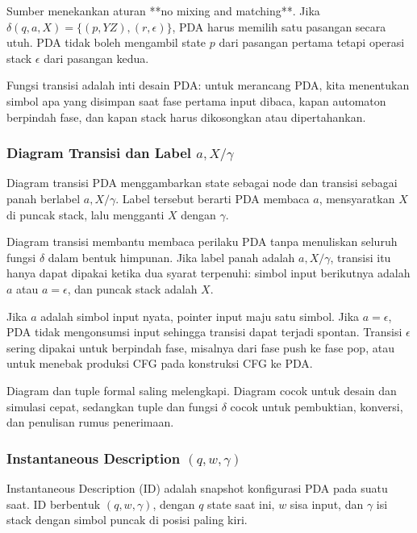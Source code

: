 Sumber menekankan aturan **no mixing and matching**. Jika $\delta(q,a,X)=\{(p,YZ),(r,\epsilon)\}$, PDA harus memilih satu pasangan secara utuh. PDA tidak boleh mengambil state $p$ dari pasangan pertama tetapi operasi stack $\epsilon$ dari pasangan kedua.

Fungsi transisi adalah inti desain PDA: untuk merancang PDA, kita menentukan simbol apa yang disimpan saat fase pertama input dibaca, kapan automaton berpindah fase, dan kapan stack harus dikosongkan atau dipertahankan.

\subsubsection{\texorpdfstring{Diagram Transisi dan Label $a,X/\gamma$}{Diagram Transisi dan Label a,X/gamma}}

\begin{jawab}
Diagram transisi PDA menggambarkan state sebagai node dan transisi sebagai panah berlabel $a,X/\gamma$. Label tersebut berarti PDA membaca $a$, mensyaratkan $X$ di puncak stack, lalu mengganti $X$ dengan $\gamma$.
\end{jawab}

Diagram transisi membantu membaca perilaku PDA tanpa menuliskan seluruh fungsi $\delta$ dalam bentuk himpunan. Jika label panah adalah $a,X/\gamma$, transisi itu hanya dapat dipakai ketika dua syarat terpenuhi: simbol input berikutnya adalah $a$ atau $a=\epsilon$, dan puncak stack adalah $X$.

Jika $a$ adalah simbol input nyata, pointer input maju satu simbol. Jika $a=\epsilon$, PDA tidak mengonsumsi input sehingga transisi dapat terjadi spontan. Transisi $\epsilon$ sering dipakai untuk berpindah fase, misalnya dari fase push ke fase pop, atau untuk menebak produksi CFG pada konstruksi CFG ke PDA.

Diagram dan tuple formal saling melengkapi. Diagram cocok untuk desain dan simulasi cepat, sedangkan tuple dan fungsi $\delta$ cocok untuk pembuktian, konversi, dan penulisan rumus penerimaan.

\subsubsection{\texorpdfstring{Instantaneous Description $(q,w,\gamma)$}{Instantaneous Description (q,w,gamma)}}

\begin{jawab}
Instantaneous Description (ID) adalah snapshot konfigurasi PDA pada suatu saat. ID berbentuk $(q,w,\gamma)$, dengan $q$ state saat ini, $w$ sisa input, dan $\gamma$ isi stack dengan simbol puncak di posisi paling kiri.
\end{jawab}

